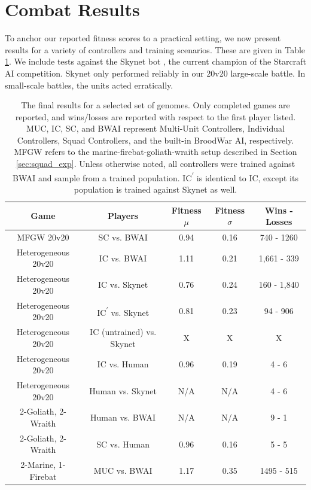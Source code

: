 \documentclass[10pt,a4paper,twocolumn]{article}
\newcommand{\fillin}[1]{X}
\begin{document}
\section{Combat Results}

To anchor our reported fitness scores to a practical setting, we now present results for a variety of controllers and training scenarios. These are given in Table \ref{tab:results}. We include tests against the Skynet bot \cite{skynet}, the current champion of the Starcraft AI competition. Skynet only performed reliably in our 20v20 large-scale battle. In small-scale battles, the units acted erratically.

\begin{table}
\centering
\begin{tabular}{|c|c|c|c|c|}
	\hline
	{\bf Game} & {\bf Players } & {\bf Fitness $\mu$} & {\bf Fitness $\sigma$} & {\bf Wins - Losses } \\ \hline
	MFGW 20v20 & SC vs. BWAI & 0.94 & 0.16 & 740 - 1260 \\ \hline
	Heterogeneous 20v20 & IC vs. BWAI & 1.11 & 0.21 & 1,661 - 339\\ \hline
	Heterogeneous 20v20 & IC vs. Skynet & 0.76 & 0.24 &  160 - 1,840 \\ \hline
	Heterogeneous 20v20 & IC\textsuperscript{$\prime$} vs. Skynet & 0.81 & 0.23 & 94 - 906 \\ \hline
	Heterogeneous 20v20 & IC (untrained) vs. Skynet & \fillin{mean} & \fillin{stddev} & \fillin{results} \\ \hline
	Heterogeneous 20v20 & IC vs. Human & 0.96 & 0.19 & 4 - 6 \\ \hline
	Heterogeneous 20v20 & Human vs. Skynet & N/A & N/A & 4 - 6 \\ \hline
	2-Goliath, 2-Wraith & Human vs. BWAI & N/A & N/A & 9 - 1\\ \hline
	2-Goliath, 2-Wraith & SC vs. Human & 0.96 & 0.16 & 5 - 5 \\ \hline
	2-Marine, 1-Firebat & MUC vs. BWAI & 1.17 & 0.35 & 1495 - 515 \\ \hline
\end{tabular}
\caption{The final results for a selected set of genomes. Only completed games are reported, and wins/losses are reported with respect to the first player listed. MUC, IC, SC, and BWAI represent Multi-Unit Controllers, Individual Controllers, Squad Controllers, and the built-in BroodWar AI, respectively. MFGW refers to the marine-firebat-goliath-wraith setup described in Section \ref{sec:squad_exp}. Unless otherwise noted, all controllers were trained against BWAI and sample from a trained population. IC\textsuperscript{$\prime$} is identical to IC, except its population is trained against Skynet as well.}
\label{tab:results}
\end{table}
\end{document}
